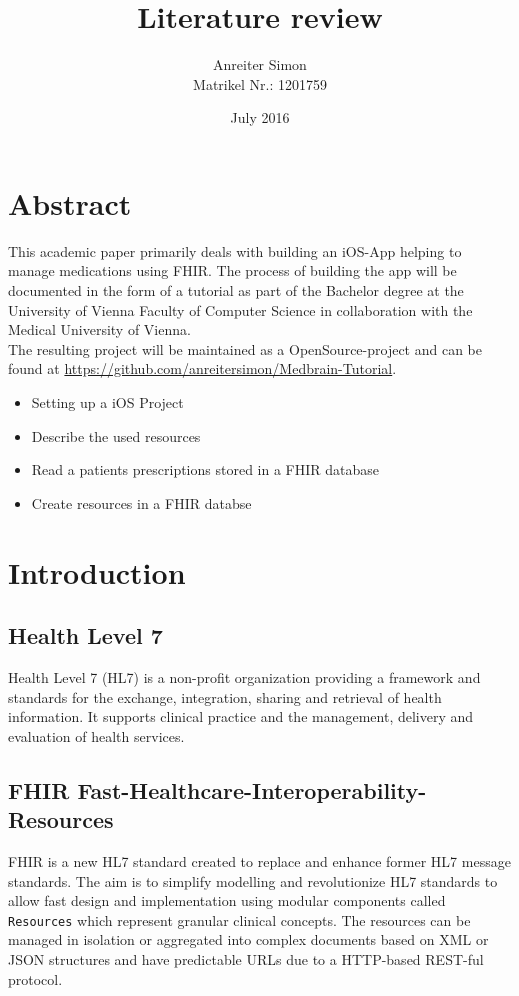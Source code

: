 \documentclass{article}
\title{Literature review}
\author{
    \large{Anreiter Simon} \\
    \small{Matrikel Nr.: 1201759}
}
\date{July 2016}
\begin{document}


\section*{Abstract}
This academic paper primarily deals with building an iOS-App helping to manage medications using FHIR.
The process of building the app will be documented in the form of a tutorial as part of the Bachelor degree at the University of Vienna Faculty of Computer Science in collaboration with the Medical University of Vienna.
\\
The resulting project will be maintained as a OpenSource-project and can be found at \url{https://github.com/anreitersimon/Medbrain-Tutorial}.
\\
\begin{itemize}
  \item
    Setting up a iOS Project
  \item
    Describe the used resources
  \item
    Read a patients prescriptions stored in a FHIR database
  \item
    Create resources in a FHIR databse
\end{itemize}
\newpage

\tableofcontents
\newpage

\section{Introduction}
\subsection{Health Level 7}
Health Level 7 (HL7) is a non-profit organization providing a framework and standards for the exchange, integration, sharing and retrieval of health information.
It supports clinical practice and the management, delivery and evaluation of health services. \citep{hl7}

\subsection{FHIR Fast-Healthcare-Interoperability-Resources}
FHIR \citep{fhir} is a new HL7 standard created to replace and enhance former HL7 message standards. The aim is to simplify modelling and revolutionize HL7 standards to allow fast design and implementation using modular components called \texttt{Resources} which represent granular clinical concepts. The resources can be managed in isolation or aggregated into complex documents based on XML or JSON structures and have predictable URLs due to a HTTP-based REST-ful protocol. \citep{fhir-wiki}
\end{document}
